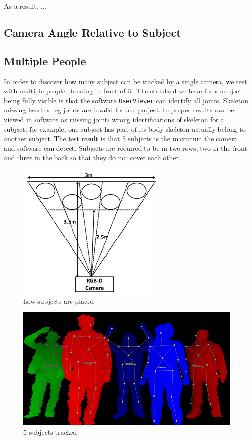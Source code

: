 \documentclass[10pt]{article}
\begin{document}
As a result, ... %

\subsection{Camera Angle Relative to Subject}


\subsection{Multiple People}
\noindent
In order to discover how many subject can be tracked by a single camera, we test with multiple people standing in front of it. The standard we have for a subject being fully visible is that the software \texttt{UserViewer} can identify all joints. Skeleton missing head or leg joints are invalid for our project. Improper results can be viewed in software as missing joints wrong identifications of skeleton for a subject, for example, one subject has part of its body skeleton actually belong to another subject. The test result is that 5 subjects is the maximum the camera and software can detect. Subjects are required to be in two rows, two in the front and three in the back so that they do not cover each other.\\
 
\begin{figure}[hbtp]
\centering
\includegraphics[scale=1]{multi_people1.jpg}
\caption{how subjects are placed}
\end{figure}
 
\begin{figure}[hbtp]
\centering
\includegraphics[scale=1]{multi_people2.jpg}
\caption{5 subjects tracked}
\end{figure}
 
\end{document}
